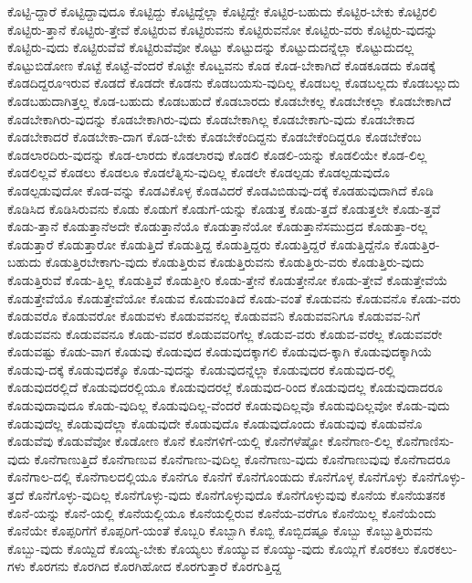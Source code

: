 {ಕೊಟ್ಟಿ-ದ್ದಾರೆ
ಕೊಟ್ಟಿದ್ದಾವುದೂ
ಕೊಟ್ಟಿದ್ದು
ಕೊಟ್ಟಿದ್ದೆಲ್ಲಾ
ಕೊಟ್ಟಿದ್ದೇ
ಕೊಟ್ಟಿರ-ಬಹುದು
ಕೊಟ್ಟಿರ-ಬೇಕು
ಕೊಟ್ಟಿರಲಿ
ಕೊಟ್ಟಿರು-ತ್ತಾನೆ
ಕೊಟ್ಟಿರು-ತ್ತೇವೆ
ಕೊಟ್ಟಿರುವ
ಕೊಟ್ಟಿರುವನು
ಕೊಟ್ಟಿರುವನೋ
ಕೊಟ್ಟಿರು-ವರು
ಕೊಟ್ಟಿರು-ವುದನ್ನು
ಕೊಟ್ಟಿರು-ವುದು
ಕೊಟ್ಟಿರುವೆವೆ
ಕೊಟ್ಟಿರುವೆವೋ
ಕೊಟ್ಟು
ಕೊಟ್ಟುದನ್ನು
ಕೊಟ್ಟುದುದನ್ನೆಲ್ಲಾ
ಕೊಟ್ಟುದುದಲ್ಲ
ಕೊಟ್ಟುಬಿಡೋಣ
ಕೊಟ್ಟೆ
ಕೊಟ್ಟೆ-ವೆಂದರೆ
ಕೊಟ್ಟೇ
ಕೊಟ್ವವನು
ಕೊಡ
ಕೊಡ-ಬೇಕಾಗಿದೆ
ಕೊಡಕೂಡದು
ಕೊಡಕ್ಕೆ
ಕೊಡದಿದ್ದರೂಇರುವ
ಕೊಡದೆ
ಕೊಡದೇ
ಕೊಡನು
ಕೊಡಬಯಸು-ವುದಿಲ್ಲ
ಕೊಡಬಲ್ಲ
ಕೊಡಬಲ್ಲದು
ಕೊಡಬಲ್ಲುದು
ಕೊಡಬಹುದಾಗಿತ್ತಲ್ಲ
ಕೊಡ-ಬಹುದು
ಕೊಡಬಹುದೆ
ಕೊಡಬಾರದು
ಕೊಡಬೇಕಲ್ಲ
ಕೊಡಬೇಕಲ್ಲಾ
ಕೊಡಬೇಕಾಗಿದೆ
ಕೊಡಬೇಕಾಗಿರು-ವುದನ್ನು
ಕೊಡಬೇಕಾಗಿರು-ವುದು
ಕೊಡಬೇಕಾಗಿಲ್ಲ
ಕೊಡಬೇಕಾಗು-ವುದು
ಕೊಡಬೇಕಾದ
ಕೊಡಬೇಕಾದರೆ
ಕೊಡಬೇಕಾ-ದಾಗ
ಕೊಡ-ಬೇಕು
ಕೊಡಬೇಕೆಂದಿದ್ದನು
ಕೊಡಬೇಕೆಂದಿದ್ದರೂ
ಕೊಡಬೇಕೆಂಬ
ಕೊಡಲಾರದಿರು-ವುದನ್ನು
ಕೊಡ-ಲಾರದು
ಕೊಡಲಾರವು
ಕೊಡಲಿ
ಕೊಡಲಿ-ಯನ್ನು
ಕೊಡಲಿಯೇ
ಕೊಡ-ಲಿಲ್ಲ
ಕೊಡಲಿಲ್ಲವೆ
ಕೊಡಲು
ಕೊಡಲೂ
ಕೊಡಲೆತ್ನಿಸು-ವುದಿಲ್ಲ
ಕೊಡಲೇ
ಕೊಡಲ್ಪಡು
ಕೊಡಲ್ಪಡುವುದೊ
ಕೊಡಲ್ಪಡುವುದೋ
ಕೊಡ-ವನ್ನು
ಕೊಡವಿಕೊಳ್ಳ
ಕೊಡವಿದರೆ
ಕೊಡವಿಬಿಡುವು-ದಕ್ಕೆ
ಕೊಡಹುವುದಾಗಿದೆ
ಕೊಡಿ
ಕೊಡಿಸಿದ
ಕೊಡಿಸಿರುವನು
ಕೊಡು
ಕೊಡುಗೆ
ಕೊಡುಗೆ-ಯನ್ನು
ಕೊಡುತ್ತ
ಕೊಡು-ತ್ತದೆ
ಕೊಡುತ್ತಲೇ
ಕೊಡು-ತ್ತವೆ
ಕೊಡು-ತ್ತಾನೆ
ಕೊಡುತ್ತಾನೆಅದೇ
ಕೊಡುತ್ತಾನೆಯೊ
ಕೊಡುತ್ತಾನೆಯೋ
ಕೊಡುತ್ತಾನೆಸಮುದ್ರದ
ಕೊಡುತ್ತಾ-ರಲ್ಲ
ಕೊಡುತ್ತಾರೆ
ಕೊಡುತ್ತಾರೋ
ಕೊಡುತ್ತಿದೆ
ಕೊಡುತ್ತಿದ್ದ
ಕೊಡುತ್ತಿದ್ದರು
ಕೊಡುತ್ತಿದ್ದರೆ
ಕೊಡುತ್ತಿದ್ದೆನೊ
ಕೊಡುತ್ತಿರ-ಬಹುದು
ಕೊಡುತ್ತಿರಬೇಕಾಗು-ವುದು
ಕೊಡುತ್ತಿರುವ
ಕೊಡುತ್ತಿರುವನು
ಕೊಡುತ್ತಿರು-ವರು
ಕೊಡುತ್ತಿರು-ವುದು
ಕೊಡುತ್ತಿರುವೆ
ಕೊಡು-ತ್ತಿಲ್ಲ
ಕೊಡುತ್ತಿವೆ
ಕೊಡುತ್ತೀರಿ
ಕೊಡು-ತ್ತೇನೆ
ಕೊಡುತ್ತೇನೋ
ಕೊಡು-ತ್ತೇವೆ
ಕೊಡುತ್ತೇವೆಯೆ
ಕೊಡುತ್ತೇವೆಯೊ
ಕೊಡುತ್ತೇವೆಯೋ
ಕೊಡುವ
ಕೊಡುವಂತಿದೆ
ಕೊಡು-ವಂತೆ
ಕೊಡುವನು
ಕೊಡುವನೊ
ಕೊಡು-ವರು
ಕೊಡುವರೊ
ಕೊಡುವರೋ
ಕೊಡುವಳು
ಕೊಡುವವನಲ್ಲ
ಕೊಡುವವನಿ
ಕೊಡುವವನಿಗೂ
ಕೊಡುವವ-ನಿಗೆ
ಕೊಡುವವನು
ಕೊಡುವವನೂ
ಕೊಡು-ವವರ
ಕೊಡುವವರಿಗೆಲ್ಲ
ಕೊಡುವ-ವರು
ಕೊಡುವ-ವರೆಲ್ಲ
ಕೊಡುವವರೇ
ಕೊಡುವಷ್ಟು
ಕೊಡು-ವಾಗ
ಕೊಡುವು
ಕೊಡುವುದ
ಕೊಡುವುದಕ್ಕಾಗಲಿ
ಕೊಡುವುದ-ಕ್ಕಾಗಿ
ಕೊಡುವುದಕ್ಕಾಗಿಯೆ
ಕೊಡುವು-ದಕ್ಕೆ
ಕೊಡುವುದಕ್ಕೊ
ಕೊಡು-ವುದನ್ನು
ಕೊಡುವುದನ್ನೆಲ್ಲಾ
ಕೊಡುವುದರ
ಕೊಡುವುದ-ರಲ್ಲಿ
ಕೊಡುವುದರಲ್ಲಿದೆ
ಕೊಡುವುದರಲ್ಲಿಯೂ
ಕೊಡುವುದರಲ್ಲೆ
ಕೊಡುವುದ-ರಿಂದ
ಕೊಡುವುದಲ್ಲ
ಕೊಡುವುದಾದರೂ
ಕೊಡುವುದಾವುದೂ
ಕೊಡು-ವುದಿಲ್ಲ
ಕೊಡುವುದಿಲ್ಲ-ವೆಂದರೆ
ಕೊಡುವುದಿಲ್ಲವೊ
ಕೊಡುವುದಿಲ್ಲವೋ
ಕೊಡು-ವುದು
ಕೊಡುವುದೆಲ್ಲ
ಕೊಡುವುದೆಲ್ಲಾ
ಕೊಡುವುದೇ
ಕೊಡುವುದೊ
ಕೊಡುವುದೊಂದು
ಕೊಡುವುವು
ಕೊಡುವೆನೊ
ಕೊಡುವೆವು
ಕೊಡುವೆವೋ
ಕೊಡೋಣ
ಕೊನೆ
ಕೊನೆಗಳಿಗೆ-ಯಲ್ಲಿ
ಕೊನೆಗಳೆಷ್ಟೋ
ಕೊನೆಗಾಣ-ಲಿಲ್ಲ
ಕೊನೆಗಾಣಿಸು-ವುದು
ಕೊನೆಗಾಣುತ್ತಿದೆ
ಕೊನೆಗಾಣುವ
ಕೊನೆಗಾಣು-ವುದಿಲ್ಲ
ಕೊನೆಗಾಣು-ವುದು
ಕೊನೆಗಾಣುವುವು
ಕೊನೆಗಾದರೂ
ಕೊನೆಗಾಲ-ದಲ್ಲಿ
ಕೊನೆಗಾಲದಲ್ಲಿಯೂ
ಕೊನೆಗೂ
ಕೊನೆಗೆ
ಕೊನೆಗೊಂಡುದು
ಕೊನೆಗೊಳ್ಳ
ಕೊನೆಗೊಳ್ಳು
ಕೊನೆಗೊಳ್ಳು-ತ್ತದೆ
ಕೊನೆಗೊಳ್ಳು-ವುದಿಲ್ಲ
ಕೊನೆಗೊಳ್ಳು-ವುದು
ಕೊನೆಗೊಳ್ಳುವುದೊ
ಕೊನೆಗೊಳ್ಳುವುವು
ಕೊನೆಯ
ಕೊನೆಯತನಕ
ಕೊನೆ-ಯನ್ನು
ಕೊನೆ-ಯಲ್ಲಿ
ಕೊನೆಯಲ್ಲಿಯೂ
ಕೊನೆಯಲ್ಲಿರುವ
ಕೊನೆಯ-ವರೆಗೂ
ಕೊನೆಯಿಲ್ಲ
ಕೊನೆಯೆಂದು
ಕೊನೆಯೇ
ಕೊಪ್ಪರಿಗೆಗೆ
ಕೊಪ್ಪರಿಗೆ-ಯಂತೆ
ಕೊಬ್ಬರಿ
ಕೊಬ್ಬಾಗಿ
ಕೊಬ್ಬಿ
ಕೊಬ್ಬಿದಷ್ಟೂ
ಕೊಬ್ಬು
ಕೊಬ್ಬುತ್ತಿರುವನು
ಕೊಬ್ಬು-ವುದು
ಕೊಯ್ದಿದೆ
ಕೊಯ್ಯ-ಬೇಕು
ಕೊಯ್ಯಲು
ಕೊಯ್ಯುವ
ಕೊಯ್ಯು-ವುದು
ಕೊಯ್ಲಿಗೆ
ಕೊರಕಲು
ಕೊರಕಲು-ಗಳು
ಕೊರಗನು
ಕೊರಗಿದ
ಕೊರಗಿಹೋದ
ಕೊರಗುತ್ತಾರೆ
ಕೊರಗುತ್ತಿದ್ದ
}
